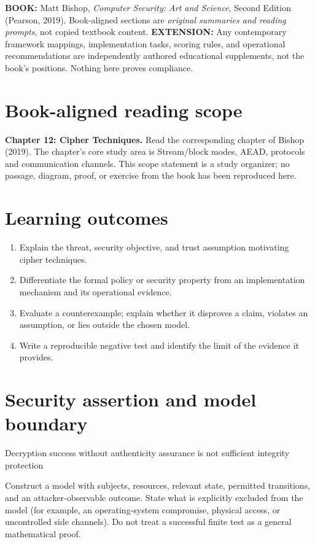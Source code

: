 \documentclass[10pt,letterpaper]{article}
\begin{document}
\makedoctocpage
\begin{notebox}
\textbf{BOOK:} Matt Bishop, \emph{Computer Security: Art and Science}, Second Edition (Pearson, 2019). Book-aligned sections are \emph{original summaries and reading prompts}, not copied textbook content.
\textbf{EXTENSION:} Any contemporary framework mappings, implementation tasks, scoring rules, and operational recommendations are independently authored educational supplements, not the book's positions. Nothing here proves compliance.
\end{notebox}
\section{Book-aligned reading scope}
\textbf{Chapter 12: Cipher Techniques.} Read the corresponding chapter of Bishop (2019). The chapter's core study area is Stream/block modes, AEAD, protocols and communication channels. This scope statement is a study organizer; no passage, diagram, proof, or exercise from the book has been reproduced here.
\section{Learning outcomes}
\begin{enumerate}
\item Explain the threat, security objective, and trust assumption motivating cipher techniques.
\item Differentiate the formal policy or security property from an implementation mechanism and its operational evidence.
\item Evaluate a counterexample; explain whether it disproves a claim, violates an assumption, or lies outside the chosen model.
\item Write a reproducible negative test and identify the limit of the evidence it provides.
\end{enumerate}
\section{Security assertion and model boundary}
\begin{infobox}
Decryption success without authenticity assurance is not sufficient integrity protection
\end{infobox}
Construct a model with subjects, resources, relevant state, permitted transitions, and an attacker-observable outcome. State what is explicitly excluded from the model (for example, an operating-system compromise, physical access, or uncontrolled side channels). Do not treat a successful finite test as a general mathematical proof.
\end{document}
